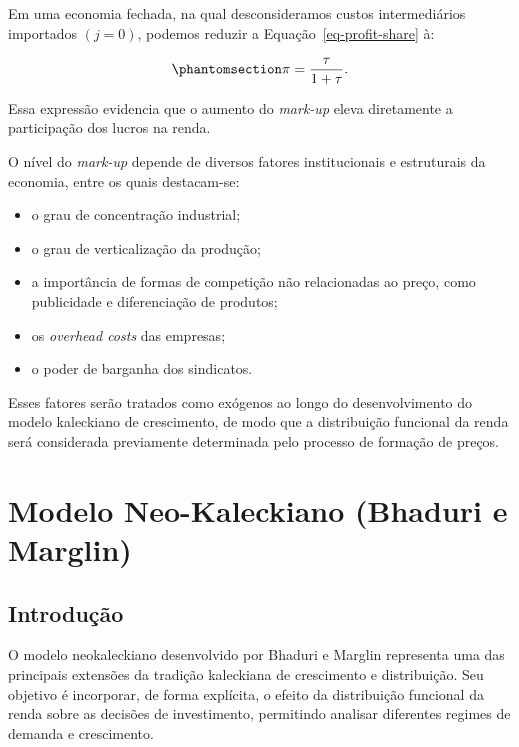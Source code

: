 \documentclass[
  brazilian,
  letterpaper,
  DIV=11,
  numbers=noendperiod]{scrreprt}
\providecommand{\tightlist}{%
  \setlength{\itemsep}{0pt}\setlength{\parskip}{0pt}}
\begin{document}
Em uma economia fechada, na qual desconsideramos custos intermediários
importados \((j=0)\), podemos reduzir a Equação~\ref{eq-profit-share} à:

\begin{equation}\protect\phantomsection\label{eq-pi}{\pi=\frac{\tau}{1+\tau}.}\end{equation}

Essa expressão evidencia que o aumento do \emph{mark-up} eleva
diretamente a participação dos lucros na renda.

O nível do \emph{mark-up} depende de diversos fatores institucionais e
estruturais da economia, entre os quais destacam-se:

\begin{itemize}
\tightlist
\item
  o grau de concentração industrial;
\item
  o grau de verticalização da produção;
\item
  a importância de formas de competição não relacionadas ao preço, como
  publicidade e diferenciação de produtos;
\item
  os \emph{overhead costs} das empresas;
\item
  o poder de barganha dos sindicatos.
\end{itemize}

Esses fatores serão tratados como exógenos ao longo do desenvolvimento
do modelo kaleckiano de crescimento, de modo que a distribuição
funcional da renda será considerada previamente determinada pelo
processo de formação de preços.


\chapter{Modelo Neo-Kaleckiano (Bhaduri e Marglin)}\label{sec-modelo-bm}

\section{Introdução}\label{sec-introducao-bm}

O modelo neokaleckiano desenvolvido por Bhaduri e Marglin representa uma
das principais extensões da tradição kaleckiana de crescimento e
distribuição. Seu objetivo é incorporar, de forma explícita, o efeito da
distribuição funcional da renda sobre as decisões de investimento,
permitindo analisar diferentes regimes de demanda e crescimento.
\end{document}
